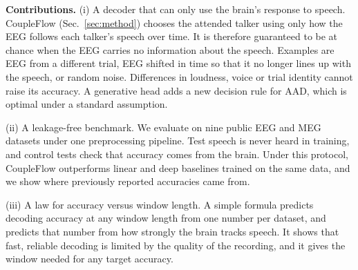 \documentclass[10pt,twocolumn,letterpaper]{article}
\begin{document}
\textbf{Contributions.} %
(i) A decoder that can only use the brain's response to speech. CoupleFlow (Sec.~\ref{sec:method}) chooses the attended talker using only how the EEG follows each talker's speech over time. It is therefore guaranteed to be at chance when the EEG carries no information about the speech. Examples are EEG from a different trial, EEG shifted in time so that it no longer lines up with the speech, or random noise. Differences in loudness, voice or trial identity cannot raise its accuracy. A generative head adds a new decision rule for AAD, which is optimal under a standard assumption.

(ii) A leakage-free benchmark. We evaluate on nine public EEG and MEG datasets under one preprocessing pipeline. Test speech is never heard in training, and control tests check that accuracy comes from the brain. Under this protocol, CoupleFlow outperforms linear and deep baselines trained on the same data, and we show where previously reported accuracies came from.

(iii) A law for accuracy versus window length. A simple formula predicts decoding accuracy at any window length from one number per dataset, and predicts that number from how strongly the brain tracks speech. It shows that fast, reliable decoding is limited by the quality of the recording, and it gives the window needed for any target accuracy.
\end{document}

